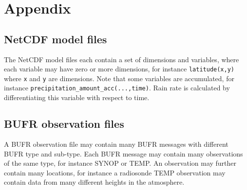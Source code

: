 \documentclass[letterpaper,10pt,twoside,twocolumn,openany]{book}
\begin{document}
{%

\hypertarget{appendix}{}
\section{Appendix}
\hypertarget{netcdf}{}
\subsection{NetCDF model files}
The NetCDF model files each contain a set of dimensions and variables, 
where each variable may have zero or more dimensions, for instance \lstinline!latitude(x,y)! where
\lstinline!x! and \lstinline!y! are dimensions. 
Note that some variables are accumulated, for instance \lstinline!precipitation_amount_acc(...,time)!. 
Rain rate is calculated by differentiating this variable with respect to time.

\hypertarget{bufr}{}
\subsection{BUFR observation files}
A BUFR observation file may contain many BUFR messages with different BUFR type and sub-type.
Each BUFR message may contain many observations of the same type, for instance SYNOP or TEMP. 
An observation may further contain many locations, for instance a radiosonde TEMP 
observation may contain data from many different heights in the atmosphere.


\hypertarget{sequence}{}
}
\end{document}
